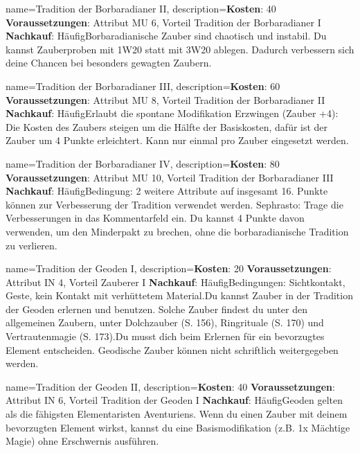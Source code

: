 {
    name={Tradition der Borbaradianer II},
    description={\textbf{Kosten}: 40 \textbf{Voraussetzungen}: Attribut MU 6, Vorteil Tradition der Borbaradianer I \textbf{Nachkauf}: Häufig\newline Borbaradianische Zauber sind chaotisch und instabil. Du kannst Zauberproben mit 1W20 statt mit 3W20 ablegen. Dadurch verbessern sich deine Chancen bei besonders gewagten Zaubern.}
}


{
    name={Tradition der Borbaradianer III},
    description={\textbf{Kosten}: 60 \textbf{Voraussetzungen}: Attribut MU 8, Vorteil Tradition der Borbaradianer II \textbf{Nachkauf}: Häufig\newline Erlaubt die spontane Modifikation Erzwingen (Zauber +4): Die Kosten des Zaubers steigen um die Hälfte der Basiskosten, dafür ist der Zauber um 4 Punkte erleichtert. Kann nur einmal pro Zauber eingesetzt werden.}
}


{
    name={Tradition der Borbaradianer IV},
    description={\textbf{Kosten}: 80 \textbf{Voraussetzungen}: Attribut MU 10, Vorteil Tradition der Borbaradianer III \textbf{Nachkauf}: Häufig\newline Bedingung: 2 weitere Attribute auf insgesamt 16. Punkte können zur Verbesserung der Tradition verwendet werden. Sephrasto: Trage die Verbesserungen in das Kommentarfeld ein. Du kannst 4 Punkte davon verwenden, um den Minderpakt zu brechen, ohne die borbaradianische Tradition zu verlieren.}
}


{
    name={Tradition der Geoden I},
    description={\textbf{Kosten}: 20 \textbf{Voraussetzungen}: Attribut IN 4, Vorteil Zauberer I \textbf{Nachkauf}: Häufig\newline Bedingungen: Sichtkontakt, Geste, kein Kontakt mit verhüttetem Material.\newline Du kannst Zauber in der Tradition der Geoden erlernen und benutzen. Solche Zauber findest du unter den allgemeinen Zaubern, unter Dolchzauber (S. 156), Ringrituale (S. 170) und Vertrautenmagie (S. 173).\newline Du musst dich beim Erlernen für ein bevorzugtes Element entscheiden. Geodische Zauber können nicht schriftlich weitergegeben werden.}
}


{
    name={Tradition der Geoden II},
    description={\textbf{Kosten}: 40 \textbf{Voraussetzungen}: Attribut IN 6, Vorteil Tradition der Geoden I \textbf{Nachkauf}: Häufig\newline Geoden gelten als die fähigsten Elementaristen Aventuriens. Wenn du einen Zauber mit deinem bevorzugten Element wirkst, kannst du eine Basismodifikation (z.B. 1x Mächtige Magie) ohne Erschwernis ausführen.}
}


